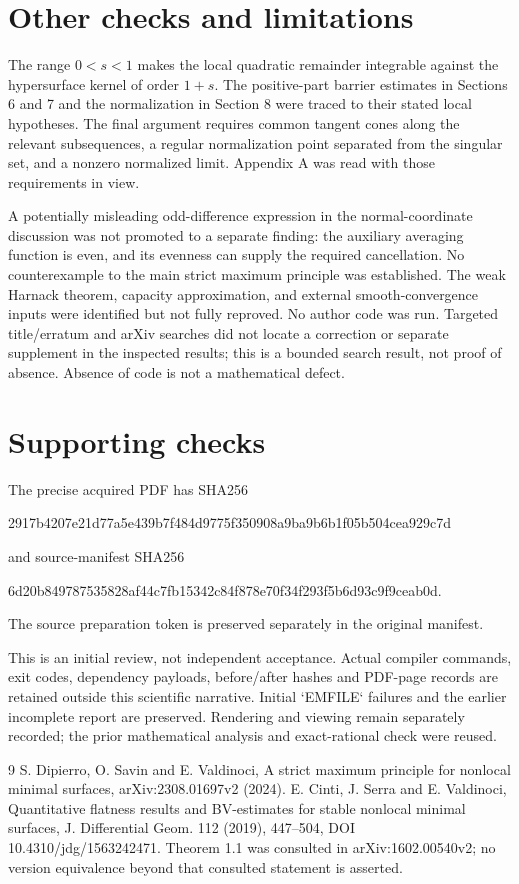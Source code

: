 \documentclass[10pt]{article}
\begin{document}
\section*{Other checks and limitations}
The range \(0<s<1\) makes the local quadratic remainder integrable against the hypersurface kernel of order \(1+s\). The positive-part barrier estimates in Sections 6 and 7 and the normalization in Section 8 were traced to their stated local hypotheses. The final argument requires common tangent cones along the relevant subsequences, a regular normalization point separated from the singular set, and a nonzero normalized limit. Appendix A was read with those requirements in view.\par
A potentially misleading odd-difference expression in the normal-coordinate discussion was not promoted to a separate finding: the auxiliary averaging function is even, and its evenness can supply the required cancellation. No counterexample to the main strict maximum principle was established. The weak Harnack theorem, capacity approximation, and external smooth-convergence inputs were identified but not fully reproved. No author code was run. Targeted title/erratum and arXiv searches did not locate a correction or separate supplement in the inspected results; this is a bounded search result, not proof of absence. Absence of code is not a mathematical defect.\par
\section*{Supporting checks}
The precise acquired PDF has SHA256\par
2917b4207e21d77a5e439b7f484d9775f350908a9ba9b6b1f05b504cea929c7d\par
and source-manifest SHA256\par
6d20b849787535828af44c7fb15342c84f878e70f34f293f5b6d93c9f9ceab0d.\par
The source preparation token is preserved separately in the original manifest.\par
This is an initial review, not independent acceptance. Actual compiler commands, exit codes, dependency payloads, before/after hashes and PDF-page records are retained outside this scientific narrative. Initial `EMFILE` failures and the earlier incomplete report are preserved. Rendering and viewing remain separately recorded; the prior mathematical analysis and exact-rational check were reused.\par
9 S. Dipierro, O. Savin and E. Valdinoci, A strict maximum principle for nonlocal minimal surfaces, arXiv:2308.01697v2 (2024). E. Cinti, J. Serra and E. Valdinoci, Quantitative flatness results and BV-estimates for stable nonlocal minimal surfaces, J. Differential Geom. 112 (2019), 447–504, DOI 10.4310/jdg/1563242471. Theorem 1.1 was consulted in arXiv:1602.00540v2; no version equivalence beyond that consulted statement is asserted.\par
\end{document}
